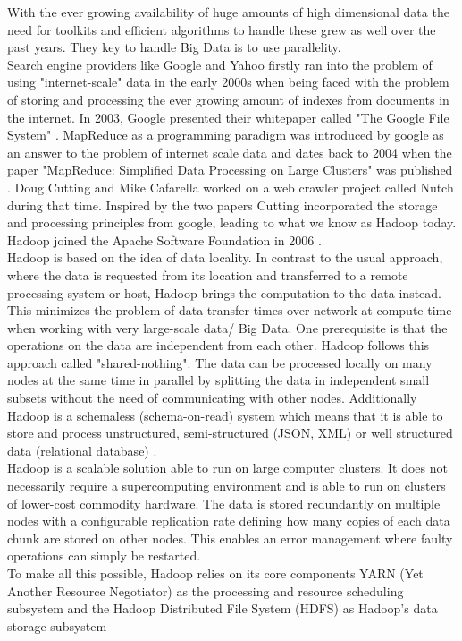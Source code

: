 With the ever growing availability of huge amounts of high dimensional data the need for toolkits and efficient algorithms to handle these grew as well over the past years. They key to handle Big Data is to use parallelity.\\
Search engine providers like Google and Yahoo firstly ran into the problem of using "internet-scale" data in the early 2000s when being faced with the problem of storing and processing the ever growing amount of indexes from documents in the internet. In 2003, Google presented their whitepaper called "The Google File System" \cite{gfs}. MapReduce as a programming paradigm was introduced by google as an answer to the problem of internet scale data and dates back to 2004 when the paper "MapReduce: Simplified Data Processing on Large Clusters" was published \cite{mapreduce1}. Doug Cutting and Mike Cafarella worked on a web crawler project called Nutch during that time. Inspired by the two papers Cutting incorporated the storage and processing principles from google, leading to what we know as Hadoop today. Hadoop joined the Apache Software Foundation in 2006 \cite[p. 6]{sparkbook1}.\\ 
Hadoop is based on the idea of data locality. In contrast to the usual approach, where the data is requested from its location and transferred to a remote processing system or host, Hadoop brings the computation to the data instead. This minimizes the problem of data transfer times over network at compute time when working with very large-scale data/ Big Data. One prerequisite is that the operations on the data are independent from each other. Hadoop follows this approach called "shared-nothing". The data can be processed locally on many nodes at the same time in parallel by splitting the data in independent small subsets without the need of communicating with other nodes. Additionally Hadoop is a schemaless (schema-on-read) system which means that it is able to store and process unstructured, semi-structured (JSON, XML) or well structured data (relational database) \cite[p. 7]{sparkbook1}.\\
Hadoop is a scalable solution able to run on large computer clusters. It does not necessarily require a supercomputing environment and is able to run on clusters of lower-cost commodity hardware. The data is stored redundantly on multiple nodes with a configurable replication rate defining how many copies of each data chunk are stored on other nodes. This enables an error management where faulty operations can simply be restarted.\\
To make all this possible, Hadoop relies on its core components YARN (Yet Another Resource Negotiator) as the processing and resource scheduling subsystem and the Hadoop Distributed File System (HDFS) as Hadoop's data storage subsystem\\

